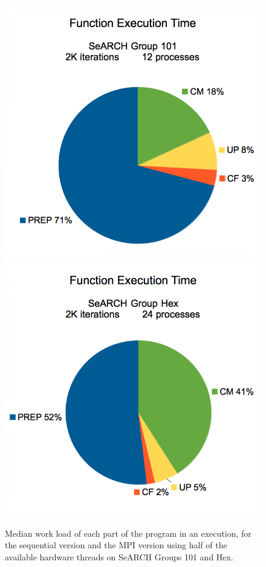 \begin{figure}[!t]
\begin{center}
		\includegraphics[width=\columnwidth]{report.may/images/load12101.png}
		\includegraphics[width=\columnwidth]{report.may/images/load24hex.png}
		\caption[Work loads]{Median work load of each part of the program in an execution, for the sequential version and the MPI version using half of the available hardware threads on SeARCH Groups 101 and Hex.}
	\end{center}
	\label{fig:load1}
\end{figure}

